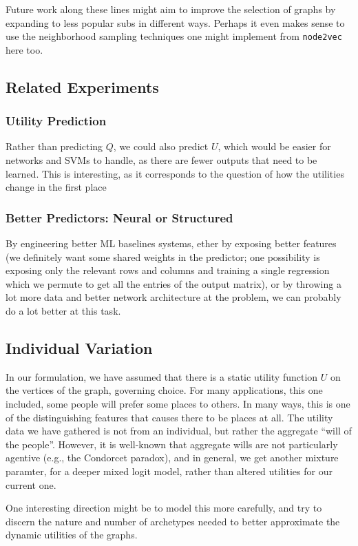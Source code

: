 \documentclass{article}
\theoremstyle{definition}
\begin{document}
	Future work along these lines might aim to improve the selection of graphs by expanding to less popular subs in different ways. Perhaps it even makes sense to use the neighborhood sampling techniques one might implement from \texttt{node2vec} here too.
	
	\subsection{Related Experiments}
	\subsubsection{Utility Prediction}
	Rather than predicting $Q$, we could also predict $U$, which would be easier for networks and SVMs to handle, as there are fewer outputs that need to be learned. This is interesting, as it corresponds to the question of how the utilities change in the first place 
	
	\subsubsection{Better Predictors: Neural or Structured} By engineering better ML baselines systems, ether by exposing better features (we definitely want some shared weights in the predictor; one possibility is exposing only the relevant rows and columns and training a single regression which we permute to get all the entries of the output matrix), or by throwing a lot more data and better network architecture at the problem, we can probably do a lot better at this task.  
	
	\subsection{Individual Variation}
	In our formulation, we have assumed that there is a static utility function $U$ on the vertices of the graph, governing choice. For many applications, this one included, some people will prefer some places to others. In many ways, this is one of the distinguishing features that causes there to be places at all. The utility data we have gathered is not from an individual, but rather the aggregate ``will of the people''. However, it is well-known that aggregate wills are not particularly agentive (e.g., the Condorcet paradox), and in general, we get another mixture paramter, for a deeper mixed logit model, rather than altered utilities for our current one. 
	
	One interesting direction might be to model this more carefully, and try to discern the nature and number of archetypes needed to better approximate the dynamic utilities of the graphs.
\end{document}
